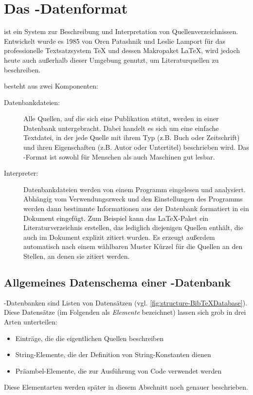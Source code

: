 \section{Das \mbox{\BibTeX-}Datenformat}
\label{sec:das-bibtex-datenformat}

\BibTeX{} ist ein System zur Beschreibung und Interpretation von
Quellenverzeichnissen.
Entwickelt wurde es 1985 von Oren Patashnik und Leslie Lamport für das
professionelle Textsatzsystem \TeX{} und dessen Makropaket \LaTeX, wird jedoch
heute auch außerhalb dieser Umgebung genutzt, um Literaturquellen zu
beschreiben.\cite{wiki:BibTeX}

\medskip
\noindent\BibTeX{} besteht aus zwei Komponenten:
\begin{description}
    \item[Datenbankdateien:] Alle Quellen, auf die sich eine Publikation
        stützt, werden in einer Datenbank untergebracht. Dabei handelt es sich
        um eine einfache Textdatei, in der jede Quelle mit ihrem Typ (z.B. Buch
        oder Zeitschrift) und ihren Eigenschaften (z.B. Autor oder Untertitel)
        beschrieben wird. Das \mbox{\BibTeX-}Format ist sowohl für Menschen als
        auch Maschinen gut lesbar.
    \item[Interpreter:] Datenbankdateien werden von einem Programm eingelesen
        und analysiert. Abhängig vom Verwendungszweck und den Einstellungen des
        Programms werden dann bestimmte Informationen aus der Datenbank
        formatiert in ein Dokument eingefügt. Zum Beispiel kann das
        \mbox{\LaTeX-}Paket  ein Literaturverzeichnis erstellen,
        das lediglich diejenigen Quellen enthält, die auch im Dokument explizit
        zitiert wurden. Es erzeugt außerdem automatisch nach einem wählbaren
        Muster Kürzel für die Quellen an den Stellen, an denen sie zitiert
        werden.
\end{description}

\subsection{Allgemeines Datenschema einer \mbox{\BibTeX-}Datenbank}

\mbox{\BibTeX-}Datenbanken sind Listen von Datensätzen (vgl.
\autoref{fig:structure-BibTeXDatabase}). Diese Datensätze (im Folgenden als
\emph{Elemente} bezeichnet) lassen sich grob in drei Arten unterteilen:
\begin{itemize}
    \item Einträge, die die eigentlichen Quellen beschreiben
    \item String-Elemente, die der Definition von String-Konstanten dienen
    \item Präambel-Elemente, die zur Ausführung von Code verwendet werden
\end{itemize}
Diese Elementarten werden später in diesem Abschnitt noch genauer beschrieben.

